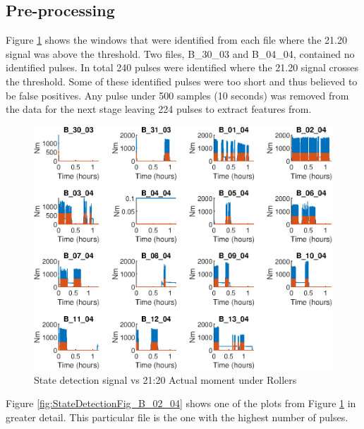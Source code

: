 \documentclass{article}
\begin{document}
\subsection{Pre-processing}
Figure \ref{fig:StateDetection} shows the windows that were identified from each file where the 21.20 signal was above the threshold. Two files, B\_30\_03 and B\_04\_04, contained no identified pulses. In total 240 pulses were identified where the 21.20 signal crosses the threshold. Some of these identified pulses were too short and thus believed to be false positives. Any pulse under 500 samples (10 seconds) was removed from the data for the next stage leaving 224 pulses to extract features from.

\begin{figure}[H]
    \centering
    \includegraphics[width=\textwidth, height=\textheight, keepaspectratio]{figures/StateDetectionFig.eps}
    \caption{State detection signal vs 21:20 Actual moment under Rollers}
    \label{fig:StateDetection}
\end{figure}

Figure \ref{fig:StateDetectionFig_B_02_04} shows one of the plots from Figure \ref{fig:StateDetection} in greater detail. This particular file is the one with the highest number of pulses.
\end{document}
